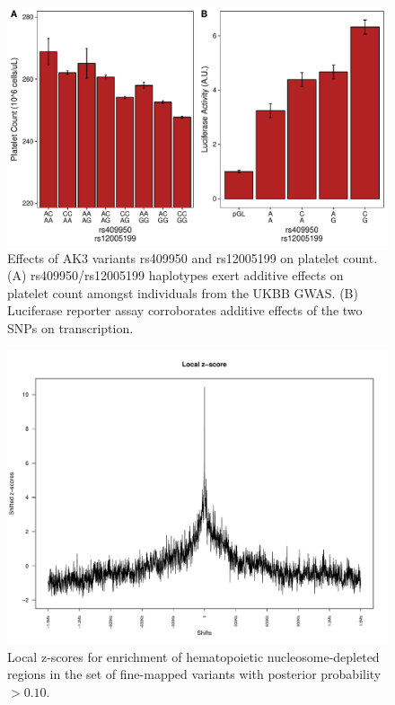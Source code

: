\documentclass{article}\usepackage[]{graphicx}\usepackage[]{color}
\makeatletter
\def\maxwidth{ %
  \ifdim\Gin@nat@width>\linewidth
    \linewidth
  \else
    \Gin@nat@width
  \fi
}
\newenvironment{knitrout}{}{} %
\makeatother
\begin{document}
\begin{knitrout}
\color{fgcolor}\begin{figure}[H]

{\centering \includegraphics[width=\maxwidth]{figure/ak3Phenos_Reporter-1} 

}

\caption[Effects of AK3 variants rs409950 and rs12005199 on platelet count]{Effects of AK3 variants rs409950 and rs12005199 on platelet count. (A) rs409950/rs12005199 haplotypes exert additive effects on platelet count amongst individuals from the UKBB GWAS. (B) Luciferase reporter assay corroborates additive effects of the two SNPs on transcription.}\label{fig:ak3Phenos_Reporter}
\end{figure}


\end{knitrout}

\begin{figure}
\centering
\includegraphics[width=\linewidth]{staticFigures/FINEMAP_PP10_localzscore_10000.pdf}
\caption{Local z-scores for enrichment of hematopoietic nucleosome-depleted regions in the set of fine-mapped variants with posterior probability $> 0.10$.}
\end{figure} 
\end{document}
